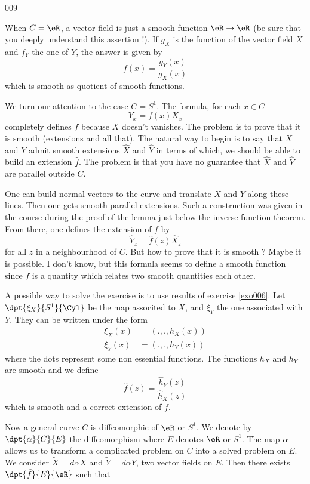 \begin{corrige}{009}


When $C=\eR$, a vector field is just a smooth function $\eR\to\eR$ (be sure that you deeply understand this assertion !). If $g_X$ is the function of the vector field $X$ and $f_Y$ the one of $Y$, the answer is given by 
\begin{equation}
  f(x)=\frac{ g_Y(x) }{ g_X(x) }
\end{equation}
which is smooth as quotient of smooth functions.

We turn our attention to the case $C=S^1$. The formula, for each $x\in C$
\[ 
  Y_x=f(x)X_x
\]
completely defines $f$ because $X$ doesn't vanishes. The problem is to prove that it is smooth (extensions and all that). The natural way to begin is to say that $X$ and $Y$ admit smooth extensions $\hat X$ and $\hat Y$ in terms of which, we should be able to build an extension $\hat f$. The problem is that you have no guarantee that $\hat X$ and $\hat Y$ are parallel outside $C$. 

One can build normal vectors to the curve and translate $X$ and $Y$ along these lines. Then one gets smooth parallel extensions. Such a construction was given in the course during the proof of the lemma just below the inverse function theorem. From there, one defines the extension of $f$ by
\[ 
  \hat Y_z=\hat f(z)\hat X_z
\]
for all $z$ in a neighbourhood of $C$. But how to prove that it is smooth ? Maybe it is possible. I don't know, but this formula seems to define a smooth function since $f$ is a quantity which relates two smooth quantities each other.


A possible way to solve the exercise is to use results of exercise \ref{exo006}. Let $\dpt{ \xi_X }{ S^1 }{ \Cyl }$ be the map associted to $X$, and $\xi_Y$ the one associated with $Y$. They can be written under the form
\begin{subequations}
\begin{align}
   \xi_X(x)&=(.,.,h_X(x))\\
   \xi_Y(x)&=(.,.,h_Y(x))
\end{align}
\end{subequations}
where the dots represent some non essential functions. The functions $h_X$ and $h_Y$ are smooth and we define
\[ 
  \hat f(z)=\frac{ \hat h_Y(z) }{ \hat h_X(z) }
\]
which is smooth and a correct extension of $f$.

Now a general curve $C$ is diffeomorphic of $\eR$ or $S^1$. We denote by $\dpt{ \alpha }{ C }{ E }$ the diffeomorphism where $E$ denotes $\eR$ or $S^1$. The map $\alpha$ allows us to transform a complicated problem on $C$ into a solved problem on $E$. We consider $\tilde X=d\alpha X$ and $\tilde Y=d\alpha Y$, two vector fields on $E$. Then there exists $\dpt{ \tilde f }{ E }{ \eR }$ such that 


\end{corrige}
